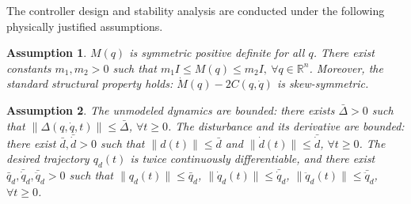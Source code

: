 \documentclass[pdflatex,sn-mathphys-num]{sn-jnl}%
\theoremstyle{thmstyleone}%
\newtheorem{assumption}{Assumption}
\theoremstyle{thmstyletwo}%
\theoremstyle{thmstylethree}%
\begin{document}
\par The controller design and stability analysis are conducted under the following physically justified assumptions.
\begin{assumption}\cite{Spong_2022_historicalperspective}   \label{assumption:1}
	$M(q)$ is symmetric positive definite for all $q$. There exist constants $m_1,m_2>0$ such that
	$m_1 I \le M(q) \le m_2 I,\ \forall q\in\mathbb{R}^n$.
	Moreover, the standard structural property holds: $\dot M(q)-2C(q,\dot q)$ is skew-symmetric.
	\end{assumption}
	
	\begin{assumption}  \label{assumption:2}
	The unmodeled dynamics are bounded: there exists $\bar{\Delta}>0$ such that
	$\|\Delta(q,\dot q,t)\|\le \bar{\Delta}$, $\forall t\ge 0$.
	The disturbance and its derivative are bounded: there exist $\bar d,\bar{\dot d}>0$ such that
	$\|d(t)\|\le \bar d$ and $\|\dot d(t)\|\le \bar{\dot d}$, $\forall t\ge 0$.
	The desired trajectory $q_d(t)$ is twice continuously differentiable, and there exist
	$\bar q_d,\bar{\dot q}_d,\bar{\ddot q}_d>0$ such that
	$\|q_d(t)\|\le \bar q_d$, $\|\dot q_d(t)\|\le \bar{\dot q}_d$,
	$\|\ddot q_d(t)\|\le \bar{\ddot q}_d$, $\forall t\ge 0$.
	\end{assumption}
\end{document}

